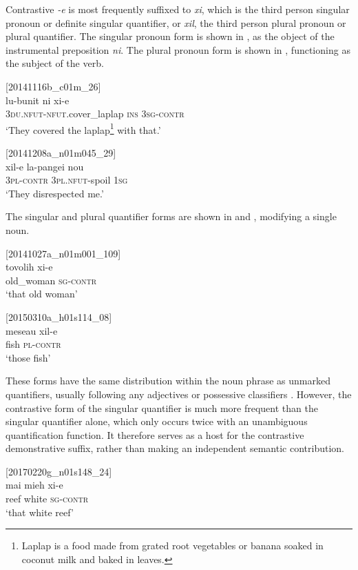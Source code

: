 \documentclass[output=paper,colorlinks,citecolor=brown]{langscibook}
\begin{document}
Contrastive \textit{-e} is most frequently suffixed to \textit{xi}, which is the third person singular pronoun or definite singular quantifier, or \textit{xil}, the third person plural pronoun or plural quantifier. The singular pronoun form is shown in , as the object of the instrumental preposition \textit{ni}. The plural pronoun form is shown in , functioning as the subject of the verb.

\ea
{\label{ex:ridge:28}[20141116b\_c01m\_26]}\\
\gll lu-bunit          ni  xi-e\\
     \textsc{3du.nfut-nfut.}cover\_laplap  \textsc{ins}  \textsc{3sg-contr}\\
\glt ‘They covered the laplap\footnote{Laplap is a food made from grated root vegetables or banana soaked in coconut milk and baked in leaves.} with that.’
\z

\ea
{\label{ex:ridge:29}[20141208a\_n01m045\_29]}\\
\gll xil-e    la-pangei    nou\\
     \textsc{3pl-contr}  \textsc{3pl.nfut-}spoil  \textsc{1sg}\\
\glt ‘They disrespected me.’
\z

The singular and plural quantifier forms are shown in  and  , modifying a single noun.

\ea
{\label{ex:ridge:30}[20141027a\_n01m001\_109]}\\
\gll tovolih    xi-e\\
     old\_woman  \textsc{sg-contr}\\
\glt ‘that old woman’
\z

\ea
{\label{ex:ridge:31}[20150310a\_h01s114\_08]}\\
\gll meseau  xil-e\\
     fish  \textsc{pl-contr}\\
\glt ‘those fish’
\z

These forms have the same distribution within the noun phrase as unmarked quantifiers, usually following any adjectives  or possessive classifiers . However, the contrastive form of the singular quantifier is much more frequent than the singular quantifier alone, which only occurs twice with an unambiguous quantification function. It therefore serves as a host for the contrastive demonstrative suffix, rather than making an independent semantic contribution.

\ea
{\label{ex:ridge:32}[20170220g\_n01s148\_24]}\\
\gll mai  mieh  xi-e\\
     reef  white  \textsc{sg-contr}\\
\glt ‘that white reef’
\z
\end{document}
